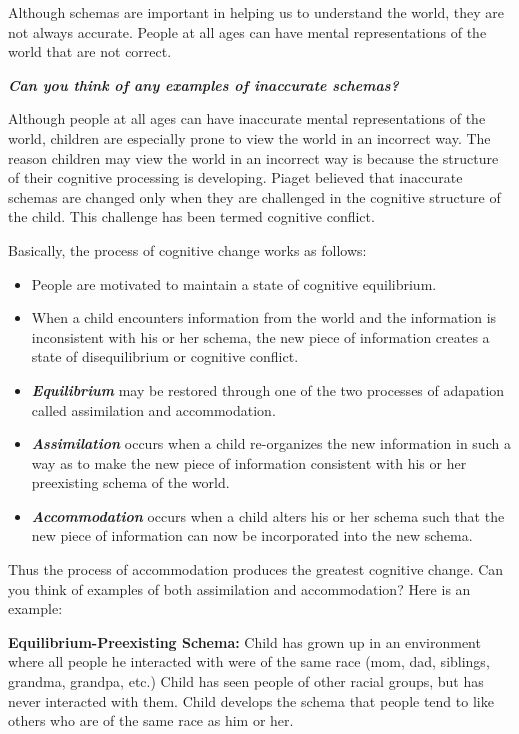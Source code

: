 \documentclass[
]{book}
\providecommand{\tightlist}{%
  \setlength{\itemsep}{0pt}\setlength{\parskip}{0pt}}
\begin{document}
Although schemas are important in helping us to understand the world, they are not always accurate. People at all ages can have mental representations of the world that are not correct.

\textbf{\emph{Can you think of any examples of inaccurate schemas?}}

Although people at all ages can have inaccurate mental representations of the world, children are especially prone to view the world in an incorrect way. The reason children may view the world in an incorrect way is because the structure of their cognitive processing is developing. Piaget believed that inaccurate schemas are changed only when they are challenged in the cognitive structure of the child. This challenge has been termed cognitive conflict.

Basically, the process of cognitive change works as follows:

\begin{itemize}
\tightlist
\item
  People are motivated to maintain a state of cognitive equilibrium.\\
\item
  When a child encounters information from the world and the information is inconsistent with his or her schema, the new piece of information creates a state of disequilibrium or cognitive conflict.\\
\item
  \textbf{\emph{Equilibrium}} may be restored through one of the two processes of adapation called assimilation and accommodation.\\
\item
  \textbf{\emph{Assimilation}} occurs when a child re-organizes the new information in such a way as to make the new piece of information consistent with his or her preexisting schema of the world.\\
\item
  \textbf{\emph{Accommodation}} occurs when a child alters his or her schema such that the new piece of information can now be incorporated into the new schema.
\end{itemize}

Thus the process of accommodation produces the greatest cognitive change. Can you think of examples of both assimilation and accommodation? Here is an example:

\textbf{Equilibrium-Preexisting Schema:} Child has grown up in an environment where all people he interacted with were of the same race (mom, dad, siblings, grandma, grandpa, etc.) Child has seen people of other racial groups, but has never interacted with them. Child develops the schema that people tend to like others who are of the same race as him or her.
\end{document}
